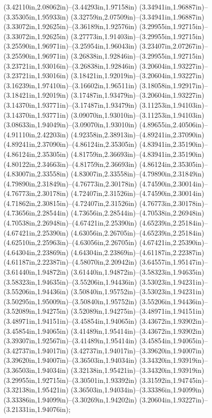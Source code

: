 (3.42110in,2.08062in)--(3.44293in,1.97158in) (3.34941in,1.96887in)--(3.35305in,1.95933in) (3.32759in,2.07509in)--(3.34941in,1.96887in) (3.33072in,1.92625in)--(3.36189in,1.92576in) (3.29955in,1.92715in)--(3.33072in,1.92625in) (3.27773in,1.91403in)--(3.29955in,1.92715in) (3.25590in,1.96971in)--(3.25954in,1.96043in) (3.23407in,2.07267in)--(3.25590in,1.96971in) (3.26838in,1.92846in)--(3.29955in,1.92715in) (3.23721in,1.93016in)--(3.26838in,1.92846in) (3.20604in,1.93227in)--(3.23721in,1.93016in) (3.18421in,1.92019in)--(3.20604in,1.93227in) (3.16239in,1.97410in)--(3.16602in,1.96511in) (3.18058in,1.92917in)--(3.18421in,1.92019in) (3.17487in,1.93479in)--(3.20604in,1.93227in) (3.14370in,1.93771in)--(3.17487in,1.93479in) (3.11253in,1.94103in)--(3.14370in,1.93771in) (3.09070in,1.93010in)--(3.11253in,1.94103in) (3.08633in,1.94049in)--(3.09070in,1.93010in) (4.89655in,2.40506in)--(4.91110in,2.42203in) (4.92358in,2.38913in)--(4.89241in,2.37090in) (4.89241in,2.37090in)--(4.86124in,2.35305in) (4.83941in,2.35190in)--(4.86124in,2.35305in) (4.81759in,2.36693in)--(4.83941in,2.35190in) (4.80122in,2.34663in)--(4.81759in,2.36693in) (4.86124in,2.35305in)--(4.83007in,2.33558in) (4.83007in,2.33558in)--(4.79890in,2.31849in) (4.79890in,2.31849in)--(4.76773in,2.30178in) (4.74590in,2.30014in)--(4.76773in,2.30178in) (4.72407in,2.31526in)--(4.74590in,2.30014in) (4.71862in,2.30815in)--(4.72407in,2.31526in) (4.76773in,2.30178in)--(4.73656in,2.28544in) (4.73656in,2.28544in)--(4.70538in,2.26948in) (4.70538in,2.26948in)--(4.67421in,2.25390in) (4.65239in,2.25184in)--(4.67421in,2.25390in) (4.63056in,2.26705in)--(4.65239in,2.25184in) (4.62510in,2.25963in)--(4.63056in,2.26705in) (4.67421in,2.25390in)--(4.64304in,2.23869in) (4.64304in,2.23869in)--(4.61187in,2.22387in) (4.61187in,2.22387in)--(4.58070in,2.20942in) (3.64557in,1.95147in)--(3.61440in,1.94872in) (3.61440in,1.94872in)--(3.58323in,1.94635in) (3.58323in,1.94635in)--(3.55206in,1.94436in) (3.53023in,1.94231in)--(3.55206in,1.94436in) (3.50840in,1.95752in)--(3.53023in,1.94231in) (3.50295in,1.95009in)--(3.50840in,1.95752in) (3.55206in,1.94436in)--(3.52089in,1.94275in) (3.52089in,1.94275in)--(3.48971in,1.94151in) (3.48971in,1.94151in)--(3.45854in,1.94065in) (3.43672in,1.93902in)--(3.45854in,1.94065in) (3.41489in,1.95414in)--(3.43672in,1.93902in) (3.39307in,1.92567in)--(3.41489in,1.95414in) (3.45854in,1.94065in)--(3.42737in,1.94017in) (3.42737in,1.94017in)--(3.39620in,1.94007in) (3.39620in,1.94007in)--(3.36503in,1.94034in) (3.34320in,1.93919in)--(3.36503in,1.94034in) (3.32138in,1.95421in)--(3.34320in,1.93919in) (3.29955in,1.92715in)--(3.30501in,1.93392in) (3.31592in,1.94745in)--(3.32138in,1.95421in) (3.36503in,1.94034in)--(3.33386in,1.94099in) (3.33386in,1.94099in)--(3.30269in,1.94202in) (3.20604in,1.93227in)--(3.21331in,1.94076in);
